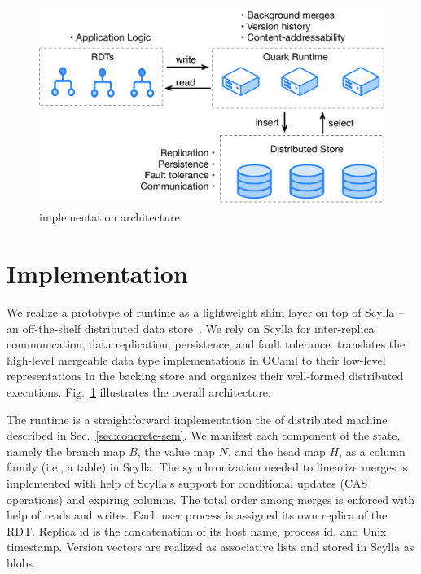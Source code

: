 \begin{figure}[ht]
  \centering
    \includegraphics[scale=0.35]{Figures/implementation2}
\caption{\quark implementation architecture}
\label{fig:implementation}
\end{figure}

\section{Implementation}
\label{sec:implementation}

We realize a prototype of \quark runtime as a lightweight shim layer
on top of Scylla -- an off-the-shelf distributed data
store~\cite{scylla}. We rely on Scylla for inter-replica
communication, data replication, persistence, and fault tolerance.
\quark translates the high-level mergeable data type implementations
in OCaml to their low-level representations in the backing store and
organizes their well-formed distributed executions.
Fig.~\ref{fig:implementation} illustrates the overall architecture.

The runtime \quark is a straightforward implementation the of
distributed machine \quark described in Sec.~\ref{sec:concrete-sem}.
We manifest each component of the state, namely the branch map $B$,
the value map $N$, and the head map $H$, as a column family (i.e., a
table) in Scylla. The synchronization needed to linearize merges is
implemented with help of Scylla's support for conditional updates (CAS
operations) and expiring columns. The total order among merges is
enforced with help of  reads and writes. Each user process
is assigned its own replica of the RDT.  Replica id is the
concatenation of its host name, process id, and Unix timestamp.
Version vectors are realized as associative lists and stored in Scylla
as blobs.

